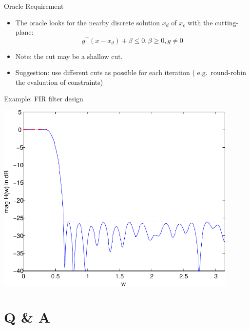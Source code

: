\documentclass[10pt,ignorenonframetext,serif,onlymath]{beamer}
\begin{document}
\begin{frame}{Oracle Requirement}
\protect\hypertarget{oracle-requirement}{}

\begin{itemize}
\item
  The oracle looks for the nearby discrete solution \(x_d\) of \(x_c\)
  with the cutting-plane:
  \[g^\top (x - x_d) + \beta \leq 0, \beta \geq 0, g \neq 0\]
\item
  Note: the cut may be a shallow cut.
\item
  Suggestion: use different cuts as possible for each iteration (
  e.g.~round-robin the evaluation of constraints)
\end{itemize}

\end{frame}

\begin{frame}{Example: FIR filter design}
\protect\hypertarget{example-fir-filter-design-1}{}

\includegraphics[width=0.9\textwidth,height=\textheight]{ellipsoid.files/lowpass_ripple.pdf}

\end{frame}

\hypertarget{q-a}{%
\section{Q \& A}\label{q-a}}
\end{document}
